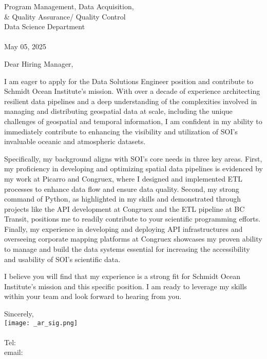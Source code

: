 \documentclass[letterpaper]{article}
\begin{document}
\large
Program Management, Data Acquisition, \\
\qquad \& Quality Assurance/ Quality Control \\
Data Science Department \\
\textbf{\JobCompany} \\

\null\hfill May 05, 2025

Dear Hiring Manager,

I am eager to apply for the Data Solutions Engineer position and contribute to Schmidt Ocean Institute's mission. 
With over a decade of experience architecting resilient data pipelines and a deep understanding of the
complexities involved in managing and distributing geospatial data at scale,
including the unique challenges of geospatial and temporal information, I am confident in my ability to immediately contribute to enhancing the visibility
and utilization of SOI's invaluable oceanic and atmospheric datasets.

Specifically, my background aligns with SOI's core needs in three key areas.
First, my proficiency in developing and optimizing spatial data pipelines is evidenced by my work at Picarro and Congruex, where I designed and implemented
ETL processes to enhance data flow and ensure data quality. 
Second, my strong command of Python, as highlighted in my skills and demonstrated through
projects like the API development at Congruex and the ETL pipeline at BC Transit, positions me to 
readily contribute to your scientific programming
efforts. 
Finally, my experience in developing and deploying API infrastructures and overseeing corporate mapping 
platforms at Congruex showcases my proven ability to manage and build the data systems essential for increasing the
accessibility and usability of SOI’s scientific data.

I believe you will find that my experience is a strong fit for Schmidt Ocean
Institute’s mission and this specific position. 
I am ready to leverage my skills within your team and look forward to hearing from you.

Sincerely,\\
    \hspace{1em}
    \texttt{[image: \_ar\_sig.png]} \\
    \CVsigname \\
    \small
    Tel: \CVphone \\
    email: \CVemail
\end{document}
